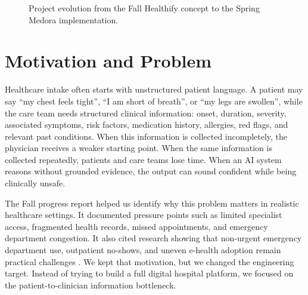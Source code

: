 \begin{figure}[htbp]
\centering
{}
\caption{Project evolution from the Fall Healthify concept to the Spring Medora implementation.}
\label{fig:fall_to_spring}
\end{figure}

\section{Motivation and Problem}

Healthcare intake often starts with unstructured patient language. A patient may say ``my chest feels tight'', ``I am short of breath'', or ``my legs are swollen'', while the care team needs structured clinical information: onset, duration, severity, associated symptoms, risk factors, medication history, allergies, red flags, and relevant past conditions. When this information is collected incompletely, the physician receives a weaker starting point. When the same information is collected repeatedly, patients and care teams lose time. When an AI system reasons without grounded evidence, the output can sound confident while being clinically unsafe.

The Fall progress report helped us identify why this problem matters in realistic healthcare settings. It documented pressure points such as limited specialist access, fragmented health records, missed appointments, and emergency department congestion. It also cited research showing that non-urgent emergency department use, outpatient no-shows, and uneven e-health adoption remain practical challenges \cite{uscher2013ed,aoa2018noshows,halwani2021ehealth}. We kept that motivation, but we changed the engineering target. Instead of trying to build a full digital hospital platform, we focused on the patient-to-clinician information bottleneck.

